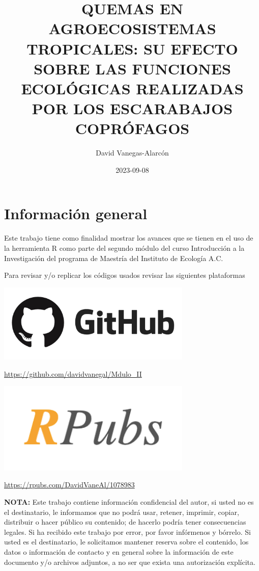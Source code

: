 \documentclass[
  11pt,
  a4paper]{book}
\title{QUEMAS EN AGROECOSISTEMAS TROPICALES: SU EFECTO SOBRE LAS FUNCIONES ECOLÓGICAS REALIZADAS POR LOS ESCARABAJOS COPRÓFAGOS}
\author{David Vanegas-Alarcón}
\date{2023-09-08}
\begin{document}
\maketitle

{
\setcounter{tocdepth}{2}
\tableofcontents
}
\hypertarget{informaciuxf3n-general}{%
\chapter{Información general}\label{informaciuxf3n-general}}

Este trabajo tiene como finalidad mostrar los avances que se tienen en el uso de la herramienta R como parte del segundo módulo del curso Introducción a la Investigación del programa de Maestría del Instituto de Ecología A.C.

Para revisar y/o replicar los códigos usados revisar las siguientes plataformas

\includegraphics[width=3.64583in,height=\textheight]{images/github.png}

\url{https://github.com/davidvanegal/Mdulo_II}

\includegraphics[width=3.64583in,height=\textheight]{images/rpubs.png}

\url{https://rpubs.com/DavidVaneAl/1078983}

\textbf{NOTA: } Este trabajo contiene información confidencial del autor, si usted no es el destinatario, le informamos que no podrá usar, retener, imprimir, copiar, distribuir o hacer público su contenido; de hacerlo podría tener consecuencias legales. Si ha recibido este trabajo por error, por favor infórmenos y bórrelo. Si usted es el destinatario, le solicitamos mantener reserva sobre el contenido, los datos o información de contacto y en general sobre la información de este documento y/o archivos adjuntos, a no ser que exista una autorización explícita.
\end{document}
